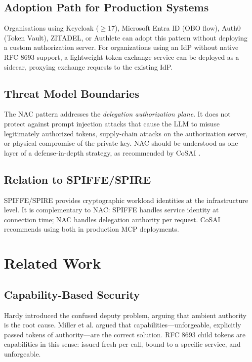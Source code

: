 \documentclass[journal]{IEEEtran}
\begin{document}
\subsection{Adoption Path for Production Systems}

Organisations using Keycloak ($\geq$17), Microsoft Entra ID (OBO flow), Auth0
(Token Vault), ZITADEL, or Authlete can adopt this pattern without deploying a
custom authorization server. For organizations using an IdP without native
RFC 8693 support, a lightweight token exchange service can be deployed as a
sidecar, proxying exchange requests to the existing IdP.

\subsection{Threat Model Boundaries}

The NAC pattern addresses the \textit{delegation authorization plane}. It does
not protect against prompt injection attacks that cause the LLM to misuse
legitimately authorized tokens, supply-chain attacks on the authorization server,
or physical compromise of the private key. NAC should be understood as one layer
of a defense-in-depth strategy, as recommended by CoSAI \cite{cosai_mcp}.

\subsection{Relation to SPIFFE/SPIRE}

SPIFFE/SPIRE \cite{spiffe} provides cryptographic workload identities at the
infrastructure level. It is complementary to NAC: SPIFFE handles service
identity at connection time; NAC handles delegation authority per request. CoSAI
\cite{cosai_mcp} recommends using both in production MCP deployments.


\section{Related Work}
\label{sec:related}

\subsection{Capability-Based Security}

Hardy \cite{hardy1988} introduced the confused deputy problem, arguing that
ambient authority is the root cause. Miller et al. \cite{miller2003} argued that
capabilities---unforgeable, explicitly passed tokens of authority---are the
correct solution. RFC 8693 child tokens are capabilities in this sense: issued
fresh per call, bound to a specific service, and unforgeable.
\end{document}
